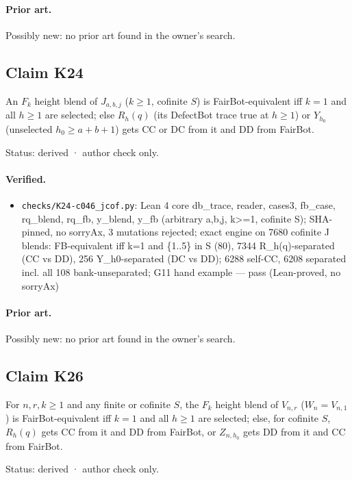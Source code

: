 \documentclass{article}
\begin{document}
\paragraph{Prior art.} Possibly new: no prior art found in the owner's search.

\subsection*{Claim K24}

An $F_k$ height blend of $J_{a,b,j}$ ($k\ge1$, cofinite $S$) is FairBot-equivalent iff $k=1$ and all $h\ge1$ are selected; else $R_h(q)$ (its DefectBot trace true at $h\ge1$) or $Y_{h_0}$ (unselected $h_0\ge a+b+1$) gets CC or DC from it and DD from FairBot.

Status: derived · author check only.

\paragraph{Verified.}
\begin{itemize}
\item \texttt{checks/K24-c046\_jcof.py}: Lean 4 core db\_trace, reader, cases3, fb\_case, rq\_blend, rq\_fb, y\_blend, y\_fb (arbitrary a,b,j, k\textgreater{}=1, cofinite S); SHA-pinned, no sorryAx, 3 mutations rejected; exact engine on 7680 cofinite J blends: FB-equivalent iff k=1 and \{1..5\} in S (80), 7344 R\_h(q)-separated (CC vs DD), 256 Y\_h0-separated (DC vs DD); 6288 self-CC, 6208 separated incl. all 108 bank-unseparated; G11 hand example --- pass (Lean-proved, no sorryAx)
\end{itemize}

\paragraph{Prior art.} Possibly new: no prior art found in the owner's search.

\subsection*{Claim K26}

For $n,r,k\ge1$ and any finite or cofinite $S$, the $F_k$ height blend of $V_{n,r}$ ($W_n=V_{n,1}$) is FairBot-equivalent iff $k=1$ and all $h\ge1$ are selected; else, for cofinite $S$, $R_h(q)$ gets CC from it and DD from FairBot, or $Z_{n,h_0}$ gets DD from it and CC from FairBot.

Status: derived · author check only.
\end{document}
